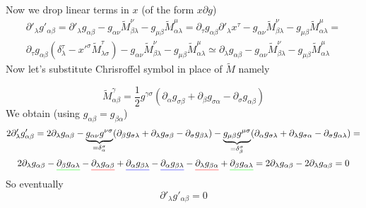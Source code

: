 %
Now we drop linear terms in $x$ (of the form $x\partial g$)
%
\begin{multline}
    \partial'_\lambda g'_{\alpha\beta} =
    \partial'_\lambda g_{\alpha\beta} -
    g_{\alpha\nu} \tilde{M}_{\beta\lambda}^\nu -
    g_{\mu\beta} \tilde{M}_{\alpha\lambda}^\mu=
    \partial_\tau g_{\alpha\beta} \partial'_\lambda x^\tau -
    g_{\alpha\nu} \tilde{M}_{\beta\lambda}^\nu -
    g_{\mu\beta} \tilde{M}_{\alpha\lambda}^\mu=\\
    \partial_\tau g_{\alpha\beta}
    \left(\delta^\tau_\lambda -
    x'^\sigma \tilde{M}_{\lambda\sigma}^\tau\right) -
    g_{\alpha\nu} \tilde{M}_{\beta\lambda}^\nu -
    g_{\mu\beta} \tilde{M}_{\alpha\lambda}^\mu \simeq
    \partial_\lambda g_{\alpha\beta} -
    g_{\alpha\nu} \tilde{M}_{\beta\lambda}^\nu -
    g_{\mu\beta} \tilde{M}_{\alpha\lambda}^\mu
\end{multline}
%
Now let's substitute Chrisroffel symbol in place of $\tilde{M}$ namely

\begin{equation}
    \tilde{M}_{\alpha\beta}^\gamma =
    \frac{1}{2}
    g^{\gamma\sigma}(\partial_\alpha g_{\sigma\beta}+
    \partial_\beta g_{\sigma\alpha}-
    \partial_\sigma g_{\alpha\beta})
\end{equation}
%
We obtain (using $g_{\alpha\beta} = g_{\beta\alpha}$)
%
\begin{multline}
    2\partial'_\lambda g'_{\alpha\beta} =
    2\partial_\lambda g_{\alpha\beta} -
    \underbrace{g_{\alpha\nu}g^{\nu\sigma}}_{=\delta_\alpha^\sigma}
    (\partial_\beta g_{\sigma\lambda}+
    \partial_\lambda g_{\sigma\beta}-
    \partial_\sigma g_{\beta\lambda})-
    \underbrace{g_{\mu\beta}g^{\mu\sigma}}_{=\delta_\beta^\sigma}
    (\partial_\alpha g_{\sigma\lambda}+
    \partial_\lambda g_{\sigma\alpha}-
    \partial_\sigma g_{\alpha\lambda}) = \\
    2\partial_\lambda g_{\alpha\beta} -
    \mathunderline{green}{\partial_\beta g_{\alpha\lambda}}-
    \mathunderline{red}{\partial_\lambda g_{\alpha\beta}}+
    \mathunderline{blue}{\partial_\alpha g_{\beta\lambda}}-
    \mathunderline{blue}{\partial_\alpha g_{\beta\lambda}}-
    \mathunderline{red}{\partial_\lambda g_{\beta\alpha}}+
    \mathunderline{green}{\partial_\beta g_{\alpha\lambda}}=
    2\partial_\lambda g_{\alpha\beta} -
    2\partial_\lambda g_{\alpha\beta} = 0
\end{multline}
%
So eventually
%
\begin{equation}
    \boxed{\partial'_\lambda g'_{\alpha\beta}=0}
\end{equation}

